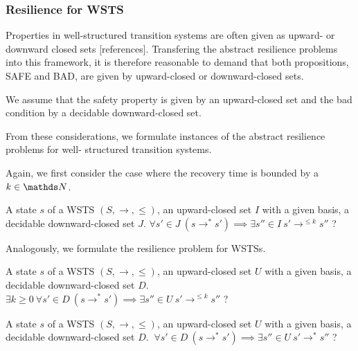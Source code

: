\subsubsection{Resilience for WSTS}


Properties in well-structured transition systems are often given as upward- or downward closed sets [references].
Transfering the abstract resilience problems into this framework,
it is therefore reasonable to demand that both propositions, SAFE and BAD, are given by 
upward-closed or 
downward-closed sets.

We assume that the safety property is given by an upward-closed set and the bad condition by a decidable downward-closed set.


From these considerations, we formulate instances of the abstract resilience problems for well-
structured transition systems.

Again, we first consider the case where the recovery time is bounded by a $k \in \N$.

{A state $s$ of a WSTS $(S,\rightarrow, \leq)$, an upward-closed set $I$ with a given basis, a decidable downward-closed set $J$.}
{$\forall s' \in J ~ (s \rightarrow^* s') \implies \exists s'' \in I ~ s' \rightarrow^{\leq k} s''$ ?\newline}

Analogously, we formulate the resilience problem for WSTSs.

{A state $s$ of a WSTS $(S,\rightarrow, \leq)$, an upward-closed set $U$ with a given basis, a decidable downward-closed set $D$.}
{$\exists k \geq 0 ~ \forall s' \in D ~ (s \rightarrow^* s') \implies \exists s'' \in U ~ s' \rightarrow^{\leq k} s''$ ?\newline}


{A state $s$ of a WSTS $(S,\rightarrow, \leq)$, an upward-closed set $U$ with a given basis, a decidable downward-closed set $D$.}
{$ ~ \forall s' \in D ~ (s \rightarrow^* s') \implies \exists s'' \in U ~ s' \rightarrow^{*} s''$ ?\newline}


